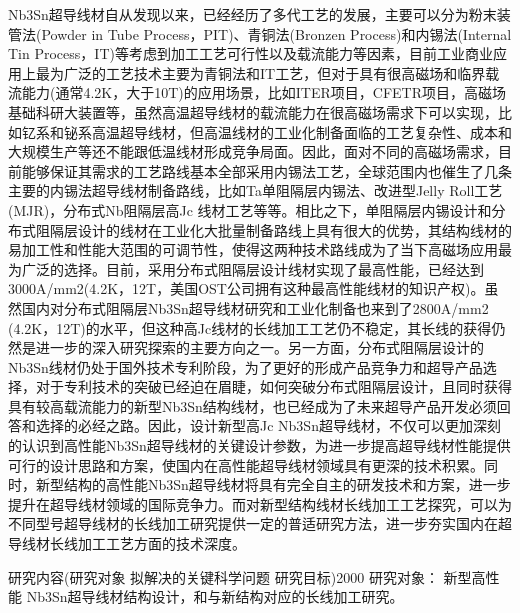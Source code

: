 \documentclass[12pt, a4paper]{ctexbook}
\begin{document}
Nb3Sn超导线材自从发现以来，已经经历了多代工艺的发展，主要可以分为粉末装管法(Powder in Tube Process，PIT)、青铜法(Bronzen Process)和内锡法(Internal Tin Process，IT)等考虑到加工工艺可行性以及载流能力等因素，目前工业商业应用上最为广泛的工艺技术主要为青铜法和IT工艺，但对于具有很高磁场和临界载流能力(通常4.2K，大于10T)的应用场景，比如ITER项目，CFETR项目，高磁场基础科研大装置等，虽然高温超导线材的载流能力在很高磁场需求下可以实现，比如钇系和铋系高温超导线材，但高温线材的工业化制备面临的工艺复杂性、成本和大规模生产等还不能跟低温线材形成竞争局面。因此，面对不同的高磁场需求，目前能够保证其需求的工艺路线基本全部采用内锡法工艺，全球范围内也催生了几条主要的内锡法超导线材制备路线，比如Ta单阻隔层内锡法、改进型Jelly Roll工艺(MJR)，分布式Nb阻隔层高Jc 线材工艺等等。相比之下，单阻隔层内锡设计和分布式阻隔层设计的线材在工业化大批量制备路线上具有很大的优势，其结构线材的易加工性和性能大范围的可调节性，使得这两种技术路线成为了当下高磁场应用最为广泛的选择。目前，采用分布式阻隔层设计线材实现了最高性能，已经达到3000A/mm2(4.2K，12T，美国OST公司拥有这种最高性能线材的知识产权)。虽然国内对分布式阻隔层Nb3Sn超导线材研究和工业化制备也来到了2800A/mm2 (4.2K，12T)的水平，但这种高Jc线材的长线加工工艺仍不稳定，其长线的获得仍然是进一步的深入研究探索的主要方向之一。另一方面，分布式阻隔层设计的Nb3Sn线材仍处于国外技术专利阶段，为了更好的形成产品竞争力和超导产品选择，对于专利技术的突破已经迫在眉睫，如何突破分布式阻隔层设计，且同时获得具有较高载流能力的新型Nb3Sn结构线材，也已经成为了未来超导产品开发必须回答和选择的必经之路。因此，设计新型高Jc Nb3Sn超导线材，不仅可以更加深刻的认识到高性能Nb3Sn超导线材的关键设计参数，为进一步提高超导线材性能提供可行的设计思路和方案，使国内在高性能超导线材领域具有更深的技术积累。同时，新型结构的高性能Nb3Sn超导线材将具有完全自主的研发技术和方案，进一步提升在超导线材领域的国际竞争力。而对新型结构线材长线加工工艺探究，可以为不同型号超导线材的长线加工研究提供一定的普适研究方法，进一步夯实国内在超导线材长线加工工艺方面的技术深度。

研究内容(研究对象 拟解决的关键科学问题 研究目标)2000
研究对象：
新型高性能 Nb3Sn超导线材结构设计，和与新结构对应的长线加工研究。
\end{document}
